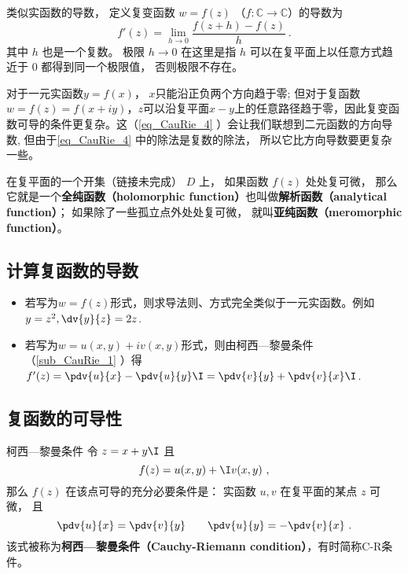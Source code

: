 
\begin{issues}
\issueTODO
\end{issues}


\begin{definition}{}
类似实函数的导数， 定义复变函数 $w = f(z)$ （$f:\mathbb C\to \mathbb C$）的导数为
\begin{equation}\label{eq_CauRie_4}
f'(z) = \lim_{h\to 0} \frac{f(z + h) - f(z)}{h}~.
\end{equation}
其中 $h$ 也是一个复数。 极限 $h \to 0$ 在这里是指 $h$ 可以在复平面上以任意方式趋近于 $0$ 都得到同一个极限值， 否则极限不存在。
\end{definition}

对于一元实函数$y=f(x)$， $x$只能沿正负两个方向趋于零; 但对于复函数$w=f(z)=f(x+iy)$，$z$可以沿复平面$x-y$上的任意路径趋于零，因此复变函数可导的条件更复杂。这（\autoref{eq_CauRie_4} ）会让我们联想到二元函数的方向导数, 但由于\autoref{eq_CauRie_4} 中的除法是复数的除法， 所以它比方向导数要更复杂一些。

在复平面的一个开集（链接未完成） $D$ 上， 如果函数 $f(z)$ 处处复可微， 那么它就是一个\textbf{全纯函数（holomorphic function）}也叫做\textbf{解析函数（analytical function）}； 如果除了一些孤立点外处处复可微， 就叫\textbf{亚纯函数（meromorphic function）}。

\subsection{计算复函数的导数}
\begin{itemize}
\item 若写为$w=f(z)$形式，则求导法则、方式完全类似于一元实函数。例如$y=z^2, \dv{y}{z}=2z$.
\item 若写为$w=u(x,y)+iv(x,y)$形式，则由柯西—黎曼条件（\autoref{sub_CauRie_1} ）得$f'(z) = \pdv{u}{x} -\pdv{u}{y} \I = \pdv{v}{y} + \pdv{v}{x}\I$.
\end{itemize}

\subsection{复函数的可导性}\label{sub_CauRie_1}

\begin{theorem}{柯西—黎曼条件}
令 $z = x + y\I$ 且
\begin{equation}
f(z) = u(x, y) + \I v(x, y)~,
\end{equation}
那么 $f(z)$ 在该点可导的充分必要条件是： 实函数 $u,v$ 在复平面的某点 $z$ 可微， 且
\begin{equation}\label{eq_CauRie_1}
\pdv{u}{x} = \pdv{v}{y} \qquad
\pdv{u}{y} = - \pdv{v}{x}~.
\end{equation}
该式被称为\textbf{柯西—黎曼条件（Cauchy-Riemann condition）}，有时简称C-R条件。
\end{theorem}

